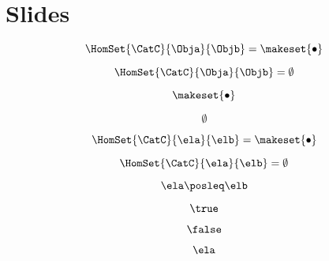 
\section{Slides}
\label{sec:enrichment-slides}

\begin{forslides}

    \begin{equation}
        \label{eq:slides_enrichment_1}
        \HomSet{\CatC}{\Obja}{\Objb} = \makeset{ \bullet }
    \end{equation}

    \begin{equation}
        \label{eq:slides_enrichment_2}
        \HomSet{\CatC}{\Obja}{\Objb} = \emptyset
    \end{equation}

    \begin{equation}
        \label{eq:slides_enrichment_3}
        \makeset{ \bullet }
    \end{equation}

    \begin{equation}
        \label{eq:slides_enrichment_4}
        \emptyset
    \end{equation}

    \begin{equation}
        \label{eq:slides_enrichment_5}
        \HomSet{\CatC}{\ela}{\elb} = \makeset{ \bullet }
    \end{equation}

    \begin{equation}
        \label{eq:slides_enrichment_6}
        \HomSet{\CatC}{\ela}{\elb} = \emptyset
    \end{equation}

    \begin{equation}
        \label{eq:slides_enrichment_7}
        \ela \posleq \elb
    \end{equation}

    \begin{equation}
        \label{eq:slides_enrichment_8}
        \true
    \end{equation}

    \begin{equation}
        \label{eq:slides_enrichment_9}
        \false
    \end{equation}

    \begin{equation}
        \label{eq:slides_enrichment_10}
        \ela
    \end{equation}


\end{forslides}
